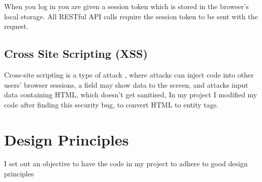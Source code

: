 When you log in you are given a session token which is stored in the browser's local storage.
All RESTful API calls require the session token to be sent with the request.

\subsection{Cross Site Scripting (XSS)}
Cross-site scripting is a type of attack \cite{XSS}, where attacks can inject code into other users' browser sessions, a field may show data to the screen, and attacks input data containing HTML, which doesn't get sanitised, In my project I modified my code after finding this security bug, to convert HTML to entity tags. 

%


\section {Design Principles}
I set out an objective to have the code in my project to adhere to good design principles

